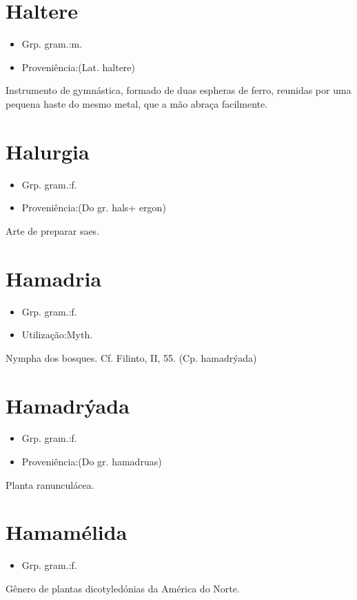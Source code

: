 \documentclass{article}
\begin{document}
\section{Haltere}
\begin{itemize}
\item {Grp. gram.:m.}
\end{itemize}
\begin{itemize}
\item {Proveniência:(Lat. \textunderscore haltere\textunderscore )}
\end{itemize}
Instrumento de gymnástica, formado de duas espheras de ferro, reunidas por uma pequena haste do mesmo metal, que a mão abraça facilmente.
\section{Halurgia}
\begin{itemize}
\item {Grp. gram.:f.}
\end{itemize}
\begin{itemize}
\item {Proveniência:(Do gr. \textunderscore hals\textunderscore  + \textunderscore ergon\textunderscore )}
\end{itemize}
Arte de preparar saes.
\section{Hamadria}
\begin{itemize}
\item {Grp. gram.:f.}
\end{itemize}
\begin{itemize}
\item {Utilização:Myth.}
\end{itemize}
Nympha dos bosques. Cf. Filinto, II, 55.
(Cp. \textunderscore hamadrýada\textunderscore )
\section{Hamadrýada}
\begin{itemize}
\item {Grp. gram.:f.}
\end{itemize}
\begin{itemize}
\item {Proveniência:(Do gr. \textunderscore hamadruas\textunderscore )}
\end{itemize}
Planta ranunculácea.
\section{Hamamélida}
\begin{itemize}
\item {Grp. gram.:f.}
\end{itemize}
Gênero de plantas dicotyledónias da América do Norte.
\end{document}
